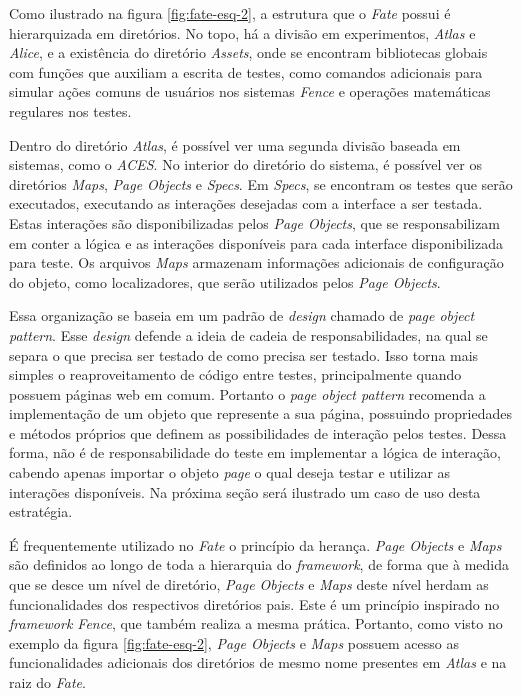 Como ilustrado na figura \ref{fig:fate-esq-2}, a estrutura que o \emph{Fate} possui é hierarquizada em diretórios. No topo, há a divisão em experimentos, \emph{Atlas} e \emph{Alice}, e a existência do diretório \emph{Assets}, onde se encontram bibliotecas globais com funções que auxiliam a escrita de testes, como comandos adicionais para simular ações comuns de usuários nos sistemas \emph{Fence} e operações matemáticas regulares nos testes.

Dentro do diretório \emph{Atlas}, é possível ver uma segunda divisão baseada em sistemas, como o \emph{ACES}. No interior do diretório do sistema, é possível ver os diretórios \emph{Maps}, \emph{Page Objects} e \emph{Specs}. Em \emph{Specs}, se encontram os testes que serão executados, executando as interações desejadas com a interface a ser testada. Estas interações são disponibilizadas pelos \emph{Page Objects}, que se responsabilizam em conter a lógica e as interações disponíveis para cada interface disponibilizada para teste. Os arquivos \emph{Maps} armazenam informações adicionais de configuração do objeto, como localizadores, que serão utilizados pelos \emph{Page Objects}.

Essa organização se baseia em um padrão de \emph{design} chamado de \emph{page object pattern}. Esse \emph{design} defende a ideia de cadeia de responsabilidades, na qual se separa o que precisa ser testado de como precisa ser testado. Isso torna mais simples o reaproveitamento de código entre testes, principalmente quando possuem páginas web em comum. Portanto o \emph{page object pattern} recomenda a implementação de um objeto que represente a sua página, possuindo propriedades e métodos próprios que definem as possibilidades de interação pelos testes. Dessa forma, não é de responsabilidade do teste em implementar a lógica de interação, cabendo apenas importar o objeto \emph{page} o qual deseja testar e utilizar as interações disponíveis. Na próxima seção será ilustrado um caso de uso desta estratégia.

É frequentemente utilizado no \emph{Fate} o princípio da herança. \emph{Page Objects} e \emph{Maps} são definidos ao longo de toda a hierarquia do \emph{framework}, de forma que à medida que se desce um nível de diretório, \emph{Page Objects} e \emph{Maps} deste nível herdam as funcionalidades dos respectivos diretórios pais. Este é um princípio inspirado no \emph{framework Fence}, que também realiza a mesma prática. Portanto, como visto no exemplo da figura \ref{fig:fate-esq-2}, \emph{Page Objects} e \emph{Maps} possuem acesso as funcionalidades adicionais dos diretórios de mesmo nome presentes em \emph{Atlas} e na raiz do \emph{Fate}.

